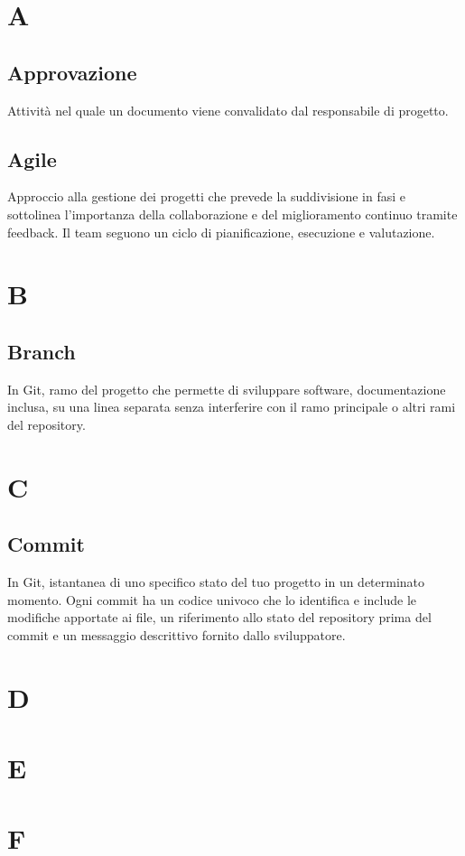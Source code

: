 \section{A}
    \subsection{Approvazione}
    Attività nel quale un documento viene convalidato dal responsabile di progetto.
    \subsection{Agile}
    Approccio alla gestione dei progetti che prevede la suddivisione in fasi e sottolinea 
    l'importanza della collaborazione e del miglioramento continuo tramite feedback. 
    Il team seguono un ciclo di pianificazione, esecuzione e valutazione.

\section{B}
    \subsection{Branch}
    In Git, ramo del progetto che permette di sviluppare software, documentazione inclusa, su una linea separata 
    senza interferire con il ramo principale o altri rami del repository.

\section{C}
    \subsection{Commit}
    In Git, istantanea di uno specifico stato del tuo progetto in un determinato momento.
    Ogni commit ha un codice univoco che lo identifica e include le modifiche apportate ai file,
    un riferimento allo stato del repository prima del commit e un messaggio descrittivo fornito dallo sviluppatore.

\section{D}
\section{E}
\section{F}
